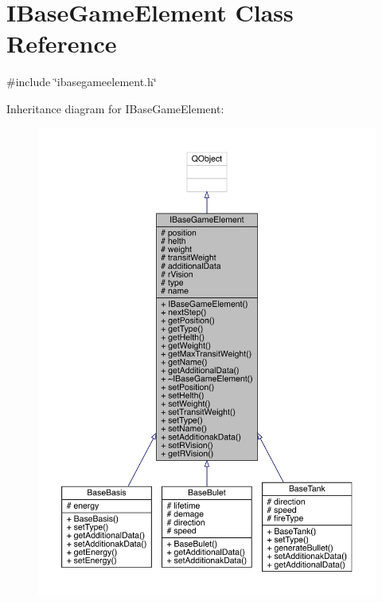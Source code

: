 \hypertarget{a00137}{}\section{I\+Base\+Game\+Element Class Reference}
\label{a00137}


{\ttfamily \#include \char`\"{}ibasegameelement.\+h\char`\"{}}



Inheritance diagram for I\+Base\+Game\+Element\+:
\nopagebreak
\begin{figure}[H]
\begin{center}
\leavevmode
\includegraphics[width=350pt]{d0/d5e/a00136}
\end{center}
\end{figure}



